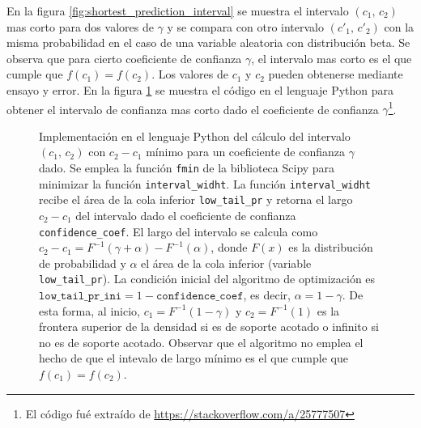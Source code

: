 \documentclass[a4paper]{report}
\begin{document}
En la figura \ref{fig:shortest_prediction_interval} se muestra el intervalo \((c_1,\,c_2)\) mas corto para dos valores de \(\gamma\) y se compara con otro intervalo \((c'_1,\,c'_2)\) con la misma probabilidad en el caso de una variable aleatoria con distribución beta. Se observa que para cierto coeficiente de confianza \(\gamma\), el intervalo mas corto es el que cumple que \(f(c_1)=f(c_2)\). Los valores de \(c_1\) y \(c_2\) pueden obtenerse mediante ensayo y error. En la figura \ref{fig:shortest_prediction_interval_code} se muestra el código en el lenguaje Python para obtener el intervalo de confianza mas corto dado el coeficiente de confianza \(\gamma\)\footnote{El código fué extraído de \url{https://stackoverflow.com/a/25777507}}.
\begin{figure}[!htb]
\begin{center}

\caption{\label{fig:shortest_prediction_interval_code} Implementación en el lenguaje Python del cálculo del intervalo \((c_1,\,c_2)\) con \(c_2-c_1\) mínimo para un coeficiente de confianza \(\gamma\) dado. Se emplea la función \texttt{fmin} de la biblioteca Scipy para minimizar la función \texttt{interval\_widht}. La función \texttt{interval\_widht} recibe el área de la cola inferior \texttt{low\_tail\_pr} y retorna el largo \(c_2-c_1\) del intervalo dado el coeficiente de confianza \texttt{confidence\_coef}. El largo del intervalo se calcula como \(c_2-c_1=F^{-1}(\gamma+\alpha)-F^{-1}(\alpha)\), donde \(F(x)\) es la distribución de probabilidad y \(\alpha\) el área de la cola inferior (variable \texttt{low\_tail\_pr}). La condición inicial del algoritmo de optimización es \(\texttt{low\_tail\_pr\_ini}=1-\texttt{confidence\_coef}\), es decir, \(\alpha=1-\gamma\). De esta forma, al inicio, \(c_1=F^{-1}(1-\gamma)\) y \(c_2=F^{-1}(1)\) es la frontera superior de la densidad si es de soporte acotado o infinito si no es de soporte acotado. Observar que el algoritmo no emplea el hecho de que el intevalo de largo mínimo es el que cumple que \(f(c_1)=f(c_2)\).}
\end{center}
\end{figure}                                                                                                                                                                                                                                                                                                                                                                                                                                                                                                                                                                                                                                                                                                                                                                                                                                                                                                                                                                                                                                                                                                                                                                           
\end{document}
